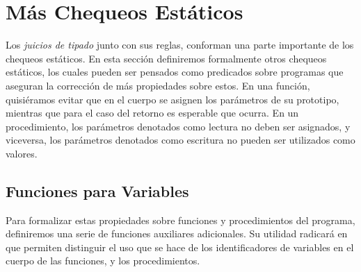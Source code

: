 \section{Más Chequeos Estáticos}


Los \textit{juicios de tipado} junto con sus reglas, conforman una parte importante de los chequeos estáticos.
En esta sección definiremos formalmente otros chequeos estáticos, los cuales pueden ser pensados como predicados sobre programas que aseguran la corrección de más propiedades sobre estos.
En una función, quisiéramos evitar que en el cuerpo se asignen los parámetros de su prototipo, mientras que para el caso del retorno es esperable que ocurra.
En un procedimiento, los parámetros denotados como lectura no deben ser asignados, y viceversa, los parámetros denotados como escritura no pueden ser utilizados como valores.

\subsection{Funciones para Variables}

Para formalizar estas propiedades sobre funciones y procedimientos del programa, definiremos una serie de funciones auxiliares adicionales.
Su utilidad radicará en que permiten distinguir el uso que se hace de los identificadores de variables en el cuerpo de las funciones, y los procedimientos.

